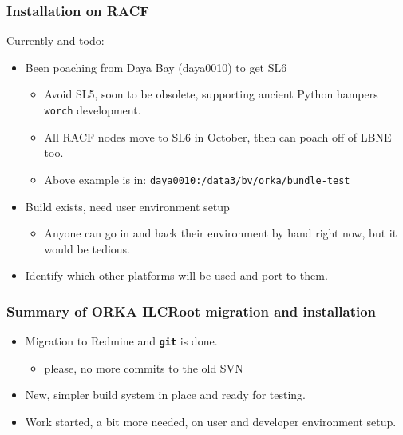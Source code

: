 \documentclass[xcolor=dvipsnames]{beamer}
\newcommand{\git}{\texttt{\textbf{git}}\xspace}
\begin{document}
\begin{frame}[fragile]
  \frametitle{Installation on RACF}

  Currently and todo:

  \begin{itemize}
  \item Been poaching from Daya Bay (daya0010) to get SL6
    \begin{itemize}
    \item Avoid SL5, soon to be obsolete, supporting ancient Python hampers \verb|worch| development.
    \item All RACF nodes move to SL6 in October, then can poach off of LBNE too.
    \item Above example is in: \verb|daya0010:/data3/bv/orka/bundle-test|
    \end{itemize}
  \item Build exists, need user environment setup
    \begin{itemize}
    \item Anyone can go in and hack their environment by hand right
      now, but it would be tedious.
    \end{itemize}
  \item Identify which other platforms will be used and port to them.
  \end{itemize}
\end{frame}


\begin{frame}
  \frametitle{Summary of ORKA ILCRoot migration and installation}
  \begin{itemize}
  \item Migration to Redmine and \git is done.
    \begin{itemize}
    \item please, no more commits to the old SVN
    \end{itemize}
  \item New, simpler build system in place and ready for testing.
  \item Work started, a bit more needed, on user and developer
    environment setup.
  \end{itemize}
\end{frame}
\end{document}
